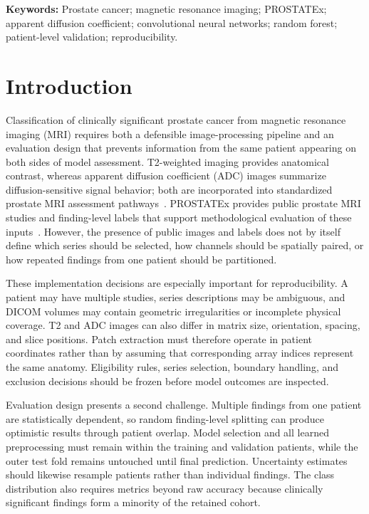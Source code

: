 \documentclass[11pt]{article}
\begin{document}
\textbf{Keywords:} Prostate cancer; magnetic resonance imaging; PROSTATEx; apparent diffusion coefficient; convolutional neural networks; random forest; patient-level validation; reproducibility.

\section{Introduction}\label{sec:1}

Classification of clinically significant prostate cancer from magnetic resonance imaging (MRI) requires both a defensible image-processing pipeline and an evaluation design that prevents information from the same patient appearing on both sides of model assessment. T2-weighted imaging provides anatomical contrast, whereas apparent diffusion coefficient (ADC) images summarize diffusion-sensitive signal behavior; both are incorporated into standardized prostate MRI assessment pathways~\cite{pirads-v21,pirads-pathway}. PROSTATEx provides public prostate MRI studies and finding-level labels that support methodological evaluation of these inputs~\cite{prostatex}. However, the presence of public images and labels does not by itself define which series should be selected, how channels should be spatially paired, or how repeated findings from one patient should be partitioned.

These implementation decisions are especially important for reproducibility. A patient may have multiple studies, series descriptions may be ambiguous, and DICOM volumes may contain geometric irregularities or incomplete physical coverage. T2 and ADC images can also differ in matrix size, orientation, spacing, and slice positions. Patch extraction must therefore operate in patient coordinates rather than by assuming that corresponding array indices represent the same anatomy. Eligibility rules, series selection, boundary handling, and exclusion decisions should be frozen before model outcomes are inspected.

Evaluation design presents a second challenge. Multiple findings from one patient are statistically dependent, so random finding-level splitting can produce optimistic results through patient overlap. Model selection and all learned preprocessing must remain within the training and validation patients, while the outer test fold remains untouched until final prediction. Uncertainty estimates should likewise resample patients rather than individual findings. The class distribution also requires metrics beyond raw accuracy because clinically significant findings form a minority of the retained cohort.
\end{document}
